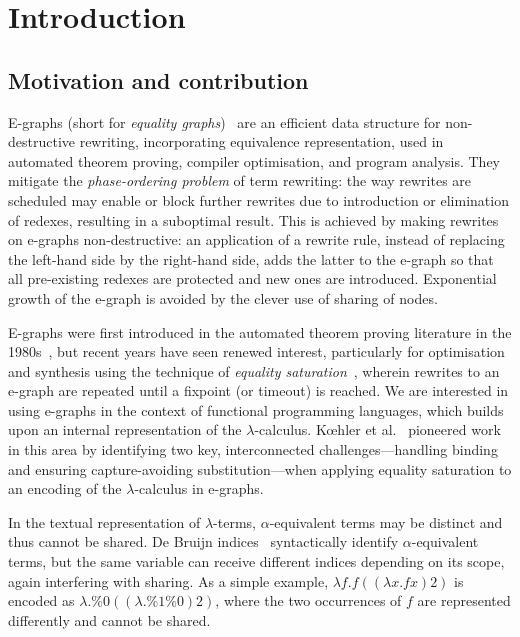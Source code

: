\section{Introduction}%
\label{sec:introduction}

\subsection{Motivation and contribution}

E-graphs (short for \emph{equality graphs})~\cite{EggPaper} are an efficient data structure for non-destructive rewriting, incorporating equivalence representation, used in automated theorem proving, compiler optimisation, and program analysis.
They mitigate the \emph{phase-ordering problem} of term rewriting: the way rewrites are scheduled may enable or block further rewrites due to introduction or elimination of redexes, resulting in a suboptimal result.
This is achieved by making rewrites on e-graphs non-destructive: an application of a rewrite rule, instead of replacing the left-hand side by the right-hand side, adds the latter to the e-graph so that all pre-existing redexes are protected and new ones are introduced.
Exponential growth of the e-graph is avoided by the clever use of sharing of nodes.

E-graphs were first introduced in the automated theorem proving literature in the 1980s~\cite{nelson1980techniques}, but recent years have seen renewed interest, particularly for optimisation and synthesis using the technique of \emph{equality saturation}~\cite{EqualitySaturation2009, flatt_small_2022, EggPaper}, wherein rewrites to an e-graph are repeated until a fixpoint (or timeout) is reached.
We are interested in using e-graphs in the context of functional programming languages, which builds upon an internal representation of the $\lambda$-calculus.
K{\oe}hler et al.~\cite{koehler2022sketchguided} pioneered work in this area by identifying two key, interconnected challenges—handling binding and ensuring capture-avoiding substitution—when applying equality saturation to an encoding of the $\lambda$-calculus in e-graphs.

In the textual representation of $\lambda$-terms, $\alpha$-equivalent terms may be distinct and thus cannot be shared.
De Bruijn indices~\cite{de1972lambda} syntactically identify $\alpha$-equivalent terms, but the same variable can receive different indices depending on its scope, again interfering with sharing.
As a simple example, $\lambda f . f ((\lambda x . f x) 2)$ is encoded as $\lambda . \%0 ((\lambda . \%1 \%0) 2)$, where the two occurrences of $f$ are represented differently and cannot be shared.

